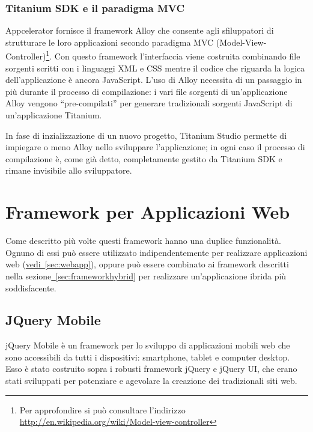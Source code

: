 			\subsubsection{Titanium SDK e il paradigma MVC}
				Appcelerator fornisce il framework Alloy che consente agli 
				sfiluppatori di strutturare le loro applicazioni secondo 
				paradigma MVC (Model-View-Controller)\footnote{Per approfondire 
				si può consultare l'indirizzo\\
				\url{http://en.wikipedia.org/wiki/Model-view-controller}}. Con 
				questo framework l'interfaccia viene costruita combinando file 
				sorgenti scritti con i linguaggi XML e CSS mentre il codice che 
				riguarda la logica dell'applicazione è ancora JavaScript. 
				L'uso di Alloy necessita di un passaggio in più durante il 
				processo di compilazione: i vari file sorgenti di 
				un'applicazione Alloy vengono ``pre-compilati'' per generare 
				tradizionali sorgenti JavaScript di un'applicazione Titanium.
				
				In fase di inzializzazione di un nuovo progetto, Titanium Studio 
				permette di impiegare o meno Alloy nello sviluppare 
				l'applicazione; in ogni caso il processo di compilazione è, come 
				già detto, completamente gestito da Titanium SDK e rimane 
				invisibile allo	sviluppatore.
			
	\section{Framework per Applicazioni Web}	
	\label{sec:frameworkwebapp}
	
		Come descritto più volte questi framework hanno una duplice funzionalità.
		Ognuno di essi può essere utilizzato indipendentemente per realizzare
		applicazioni web (\hyperref[sec:webapp]{vedi~\ref{sec:webapp}}), oppure 
		può essere combinato ai framework descritti nella 
		sezione\hyperref[sec:frameworkhybrid]{~\ref{sec:frameworkhybrid}} per
		realizzare un'applicazione ibrida più soddisfacente.
		
		\subsection{JQuery Mobile}
		\label{subsec:jQuery}
			jQuery Mobile è un framework per lo sviluppo di applicazioni mobili
			web	che sono accessibili da tutti i dispositivi: smartphone, tablet
			e computer desktop. Esso è stato costruito sopra i robusti framework
			jQuery e jQuery UI, che erano stati sviluppati per potenziare e
			agevolare la creazione dei tradizionali siti web. 
			

